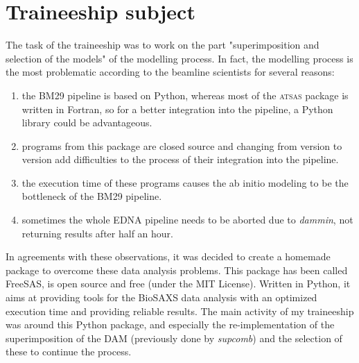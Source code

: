 \documentclass[a4paper, 11pt]{report}
\begin{document}
\section{Traineeship subject}

The task of the traineeship was to work on the part "superimposition 
and selection of the models" of the modelling process. 
In fact, the modelling process is the most problematic according to 
the beamline scientists for several reasons:
\begin{enumerate}
\item the BM29 pipeline is based on Python, whereas most
of the \textsc{atsas} package is written in Fortran, so for a better 
integration into the pipeline, a Python library could be advantageous. 
\item programs from this package are closed source and 
changing from version to version add difficulties to the process of 
their integration into the pipeline. 
\item the execution time of these programs causes the ab initio 
modeling to be the bottleneck of the BM29 pipeline. 
\item sometimes the whole EDNA pipeline needs to be aborted 
due to \textit{dammin}, not returning results after half an hour.
\end{enumerate}

In agreements with these observations, it was decided to create a 
homemade package to overcome these data analysis problems. 
This package has been called FreeSAS, is open source and free (under 
the MIT License). 
Written in Python, it aims at providing tools for the BioSAXS data 
analysis with an optimized execution time and providing reliable 
results. 
The main activity of my traineeship was around this Python package, 
and especially the re-implementation of the superimposition of the DAM 
(previously done by \textit{supcomb}) and the selection of these to 
continue the process.
\end{document}
